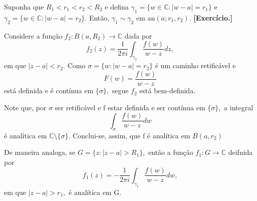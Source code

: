 \documentclass[ComplexAnalysis/complex.tex]{subfiles}
\begin{document}
\begin{proof*}
	Suponha que \(R_{1} < r_{1} < r_{2} < R_{2}\) e defina \(\gamma_{1} = \{w \in \mathbb{C}:|w -a| = r_{1}\}\) e \(\gamma_{2} = \{w \in \mathbb{C}:|w -a|=r_{2}\}\).
	Então, \(\gamma_{1}\sim \gamma _{2}\) em \(\mathrm{an}(a; r_{1}, r_{2})\). \textbf{[Exercício.]}

	Considere a função \(f_{2}:B(a, R_{2})\rightarrow \mathbb{C}\) dada por
	\[
		f_{2}(z) = \frac{1}{2\pi i} \int_{\gamma_{2}}^{}\frac{f(w)}{w-z}dz,
	\]
	em que \(|z-a| < r_{2}.\) Como \(\sigma = \{w: |w - a| = r_{2}\}\) é um caminho retificável e
	\[
		F(w) = \frac{f(w)}{w-z}
	\]
	está definida e é contínua em \(\{\sigma \},\) segue \(f_{2}\) está bem-definida.

	Note que, por \(\sigma \) ser retificável e f estar definida e ser contínua em \(\{\sigma \},\) a integral
	\[
		\int_{\sigma }^{}\frac{f(w)}{w-z}dw
	\]
	é analítica em \(\mathbb{C}\setminus{\{\sigma \}}\). Conclui-se, assim, que f é analítica em \(B(a, r_{2})\)

	De maneira analoga, se \(G = \{z: |z-a| > R_{1}\},\) então a função \(f_{1}:G\rightarrow \mathbb{C}\) deifnida por
	\[
		f_{1}(z) = -\frac{1}{2\pi i}\int_{\gamma_{1}}^{}\frac{f(w)}{w-z}dw,
	\]
	em que \(|z-a| > r_{1},\) é analítica em G.


\end{proof*}
\end{document}
